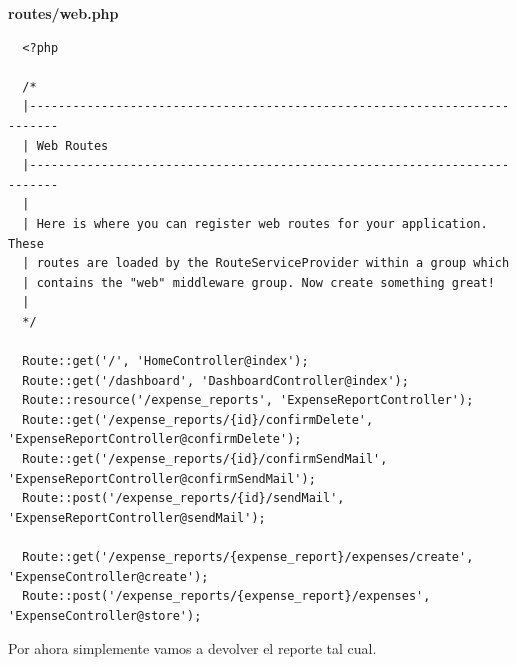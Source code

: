 \documentclass{article}
\begin{document}
\textbf{routes/web.php}
\begin{verbatim}
  <?php

  /*
  |--------------------------------------------------------------------------
  | Web Routes
  |--------------------------------------------------------------------------
  |
  | Here is where you can register web routes for your application. These
  | routes are loaded by the RouteServiceProvider within a group which
  | contains the "web" middleware group. Now create something great!
  |
  */

  Route::get('/', 'HomeController@index');
  Route::get('/dashboard', 'DashboardController@index');
  Route::resource('/expense_reports', 'ExpenseReportController');
  Route::get('/expense_reports/{id}/confirmDelete', 'ExpenseReportController@confirmDelete');
  Route::get('/expense_reports/{id}/confirmSendMail', 'ExpenseReportController@confirmSendMail');
  Route::post('/expense_reports/{id}/sendMail', 'ExpenseReportController@sendMail');

  Route::get('/expense_reports/{expense_report}/expenses/create', 'ExpenseController@create');
  Route::post('/expense_reports/{expense_report}/expenses', 'ExpenseController@store');
\end{verbatim}

Por ahora simplemente vamos a devolver el reporte tal cual.\\
\end{document}
